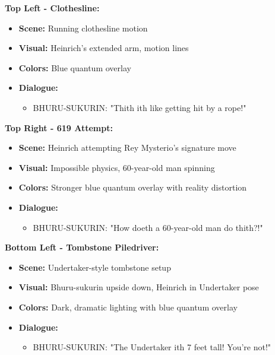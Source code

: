 \documentclass[12pt,a4paper]{article}
\begin{document}
\textbf{Top Left - Clothesline:}
\begin{itemize}
\item \textbf{Scene:} Running clothesline motion
\item \textbf{Visual:} Heinrich's extended arm, motion lines
\item \textbf{Colors:} Blue quantum overlay
\item \textbf{Dialogue:}
\begin{itemize}
\item BHURU-SUKURIN: "Thith ith like getting hit by a rope!"
\end{itemize}
\end{itemize}

\textbf{Top Right - 619 Attempt:}
\begin{itemize}
\item \textbf{Scene:} Heinrich attempting Rey Mysterio's signature move
\item \textbf{Visual:} Impossible physics, 60-year-old man spinning
\item \textbf{Colors:} Stronger blue quantum overlay with reality distortion
\item \textbf{Dialogue:}
\begin{itemize}
\item BHURU-SUKURIN: "How doeth a 60-year-old man do thith?!"
\end{itemize}
\end{itemize}

\textbf{Bottom Left - Tombstone Piledriver:}
\begin{itemize}
\item \textbf{Scene:} Undertaker-style tombstone setup
\item \textbf{Visual:} Bhuru-sukurin upside down, Heinrich in Undertaker pose
\item \textbf{Colors:} Dark, dramatic lighting with blue quantum overlay
\item \textbf{Dialogue:}
\begin{itemize}
\item BHURU-SUKURIN: "The Undertaker ith 7 feet tall! You're not!"
\end{itemize}
\end{itemize}
\end{document}
